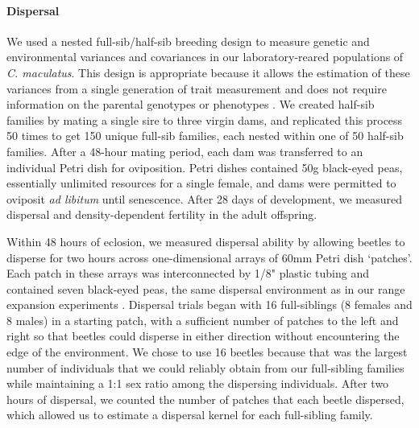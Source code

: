 \documentclass[11pt]{article}
\begin{document}
\paragraph{Dispersal}
We used a nested full-sib/half-sib breeding design to measure genetic and environmental variances and covariances in our laboratory-reared populations of \textit{C. maculatus}.
This design is appropriate because it allows the estimation of these variances from a single generation of trait measurement and does not require information on the parental genotypes or phenotypes \citep{falconer_introduction_1996,conner_primer_2004,wilson_ecologists_2010}.
We created half-sib families by mating a single sire to three virgin dams, and replicated this process 50 times to get 150 unique full-sib families, each nested within one of 50 half-sib families.
After a 48-hour mating period, each dam was transferred to an individual Petri dish for oviposition.
Petri dishes contained 50g black-eyed peas, essentially unlimited resources for a single female, and dams were permitted to oviposit \textit{ad libitum} until senescence.
After 28 days of development, we measured dispersal and density-dependent fertility in the adult offspring.

Within 48 hours of eclosion, we measured dispersal ability by allowing beetles to disperse for two hours across one-dimensional arrays of 60mm Petri dish `patches'.
Each patch in these arrays was interconnected by 1/8" plastic tubing and contained seven black-eyed peas, the same dispersal environment as in our range expansion experiments \citep{ochocki_rapid_2017}.
Dispersal trials began with 16 full-siblings (8 females and 8 males) in a starting patch, with a sufficient number of patches to the left and right so that beetles could disperse in either direction without encountering the edge of the environment.
We chose to use 16 beetles because that was the largest number of individuals that we could reliably obtain from our full-sibling families while maintaining a 1:1 sex ratio among the dispersing individuals.
After two hours of dispersal, we counted the number of patches that each beetle dispersed, which allowed us to estimate a dispersal kernel for each full-sibling family.
\end{document}
